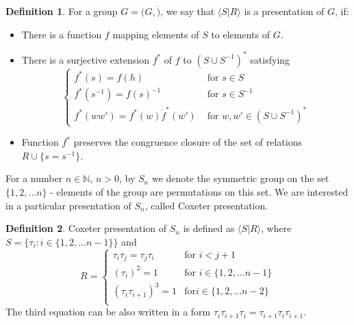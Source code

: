 \documentclass[a4paper]{article}
\newcommand{\N}{\mathbb{N}}
\newcommand{\la}{\langle}
\newcommand{\ra}{\rangle}
\theoremstyle{definition}
\newtheorem{definition}{Definition}[section]
\theoremstyle{remark}
\theoremstyle{example}
\begin{document}
\begin{definition}
For a group $G = (G, \dot)$, we say that $\la S | R \ra$ is a presentation of $G$, if:
\begin{itemize}
	\item There is a function $f$ mapping elements of $S$ to elements of $G$.
	\item There is a surjective extension $f^*$ of $f$ to $(S \cup S^{-1})^*$ satisfying
		\begin{equation}
		\begin{cases}
		f^*(s) = f(h) & \text{ for } s \in S \\
		f^*(s^{-1}) = f(s)^{-1} & \text{ for } s \in S^{-1} \\
		f^*(w w') = f^*(w) \dot f^*(w') & \text{ for } w, w' \in (S \cup S^{-1})^*
		\end{cases}
		\end{equation}
	\item Function $f^*$ preserves the congruence closure of the set of relations $R \cup \{s = s^{-1}\}$.
\end{itemize}

For a number $n \in \N$, $n>0$, by $S_n$ we denote the symmetric group on the set $\{1, 2, ... n\}$ - elements of the group are permutations on this set. We are interested in a particular presentation of $S_n$, called Coxeter presentation.
\end{definition}

\begin{definition}
Coxeter presentation of $S_n$ is defined as $\la S|R \ra$, where $S = \{\tau_i : i \in \{1, 2, ... n - 1\}\}$ and
	\begin{equation*}
		R =
		    \begin{cases}
		      \tau_i\tau_j = \tau_j\tau_i & \text{for } i < j + 1\\
		      (\tau_i)^2 = 1 & \text{for } i \in \{1, 2, ... n - 1\}\\
		      (\tau_i\tau_{i+1})^3 = 1 & \text{for} i \in \{1, 2, ... n - 2\}\\
		    \end{cases}
	\end{equation*}
The third equation can be also written in a form $\tau_i\tau_{i+1}\tau_i = \tau_{i+1}\tau_i\tau_{i+1}$.
\end{definition}
\end{document}
